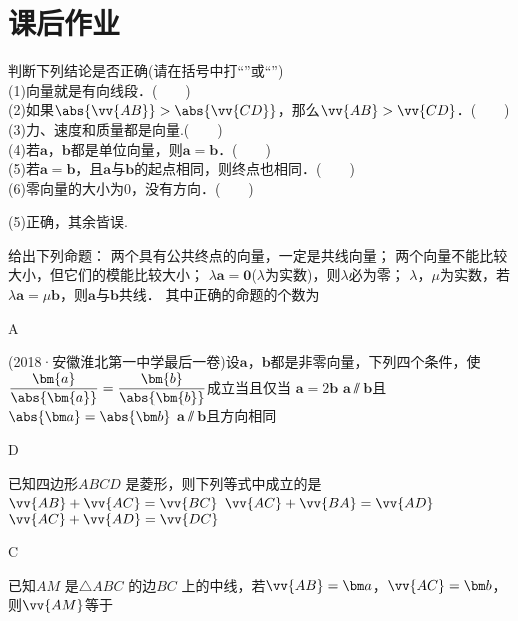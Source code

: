 \section{课后作业}
  \begin{exercise}
    \item
      判断下列结论是否正确(请在括号中打“\checkmark”或“\XSolidBrush”)\\
      (1)向量就是有向线段．(　　)\\
      (2)如果$\abs{\vv{AB}}>\abs{\vv{CD}}$，那么$\vv{AB}>\vv{CD}$．(　　)\\
      (3)力、速度和质量都是向量.(　　)\\
      (4)若$\bm a$，$\bm b$都是单位向量，则$\bm a=\bm b$．(　　)\\
      (5)若$\bm a=\bm b$，且$\bm a$与$\bm b$的起点相同，则终点也相同．(　　)\\
      (6)零向量的大小为0，没有方向．(　　)\\
      \begin{answer}
        (5)正确，其余皆误.
      \end{answer}
    \item
      给出下列命题：
      两个具有公共终点的向量，一定是共线向量；
      两个向量不能比较大小，但它们的模能比较大小；
      $\lambda\bm{a}=\bm{0}$($\lambda$为实数)，则$\lambda$必为零；
      $\lambda$，$\mu$为实数，若$\lambda\bm{a}=\mu\bm{b}$，则$\bm{a}$与$\bm{b}$共线．
      其中正确的命题的个数为\xz
      \begin{answer}
        A
      \end{answer}
    \item
      (2018·安徽淮北第一中学最后一卷)设$\bm{a}$，$\bm{b}$都是非零向量，下列四个条件，使$\dfrac{\bm{a}}{\abs{\bm{a}}}=\dfrac{\bm{b}}{\abs{\bm{b}}}$成立当且仅当\xz
      {$\bm a=2\bm b$}
      {$\bm a\varparallel\bm b$且$\abs{\bm a}=\abs{\bm b}$}
      {$\bm a\varparallel\bm b$且方向相同}
      \begin{answer}
        D
      \end{answer}
    \item
      已知四边形$ABCD$ 是菱形，则下列等式中成立的是\xz
        {$\vv{AB}+\vv{AC}=\vv{BC}$}
        {$\vv{AC}+\vv{BA}=\vv{AD}$}
        {$\vv{AC}+\vv{AD}=\vv{DC}$}
      \begin{answer}
        C
      \end{answer}
    \item
      已知$AM$ 是$\triangle ABC$ 的边$BC$ 上的中线，若$\vv{AB}=\bm a$，$\vv{AC}=\bm b$，则$\vv{AM}$等于\xz

\end{exercise}
